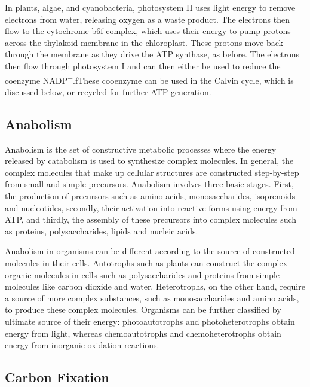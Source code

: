 In plants, algae, and cyanobacteria, photosystem II uses light energy to remove electrons from water, releasing oxygen as a waste product. The electrons then flow to the cytochrome b6f complex, which uses their energy to pump protons across the thylakoid membrane in the chloroplast. These protons move back through the membrane as they drive the ATP synthase, as before. The electrons then flow through photosystem I and can then either be used to reduce the coenzyme NADP\textsuperscript{+}.fThese cooenzyme can be used in the Calvin cycle, which is discussed below, or recycled for further ATP generation.

\hypertarget{anabolism}{%
\subsection{Anabolism}\label{anabolism}}

Anabolism is the set of constructive metabolic processes where the energy released by catabolism is used to synthesize complex molecules. In general, the complex molecules that make up cellular structures are constructed step-by-step from small and simple precursors. Anabolism involves three basic stages. First, the production of precursors such as amino acids, monosaccharides, isoprenoids and nucleotides, secondly, their activation into reactive forms using energy from ATP, and thirdly, the assembly of these precursors into complex molecules such as proteins, polysaccharides, lipids and nucleic acids.

Anabolism in organisms can be different according to the source of constructed molecules in their cells. Autotrophs such as plants can construct the complex organic molecules in cells such as polysaccharides and proteins from simple molecules like carbon dioxide and water. Heterotrophs, on the other hand, require a source of more complex substances, such as monosaccharides and amino acids, to produce these complex molecules. Organisms can be further classified by ultimate source of their energy: photoautotrophs and photoheterotrophs obtain energy from light, whereas chemoautotrophs and chemoheterotrophs obtain energy from inorganic oxidation reactions.

\hypertarget{carbon-fixation}{%
\subsection{Carbon Fixation}\label{carbon-fixation}}

